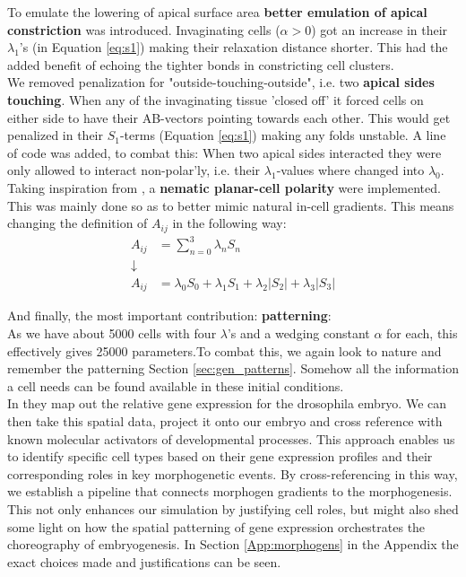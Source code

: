To emulate the lowering of apical surface area \textbf{better emulation of apical constriction} was introduced. Invaginating cells ($\alpha > 0$) got an increase in their $\lambda_1$'s (in Equation \ref{eq:s1}) making their relaxation distance shorter. This had the added benefit of echoing the tighter bonds in constricting cell clusters.\\

We removed penalization for "outside-touching-outside", i.e. two \textbf{apical sides touching}. When any of the invaginating tissue 'closed off' it forced cells on either side to have their AB-vectors pointing towards each other. This would get penalized in their $S_1$-terms (Equation \ref{eq:s1}) making any folds unstable. A line of code was added, to combat this: When two apical sides interacted they were only allowed to interact non-polar'ly, i.e. their $\lambda_1$-values where changed into $\lambda_0$.\\


Taking inspiration from , a \textbf{nematic planar-cell polarity} were implemented. This was mainly done so as to better mimic natural in-cell gradients. This means changing the definition of $A_{ij}$ in the following way:
\begin{align*}
    A_{ij}&=\sum_{n=0}^{3}\lambda_n  S_n\\ \downarrow \\A_{ij}&=\lambda_0S_0+\lambda_1S_1+\lambda_2|S_2|+\lambda_3|S_3|
\end{align*}


And finally, the most important contribution: \textbf{patterning}:\\
As we have about 5000 cells with four $\lambda$'s and a wedging constant $\alpha$ for each, this effectively gives 25000 parameters.To combat this, we again look to nature and remember the patterning Section \ref{sec:gen_patterns}. Somehow all the information a cell needs can be found available in these initial conditions.\\


In  they map out the relative gene expression for the drosophila embryo. We can then take this spatial data, project it onto our embryo and cross reference with known molecular activators of developmental processes.  This approach enables us to identify specific cell types based on their gene expression profiles and their corresponding roles in key morphogenetic events. By cross-referencing in this way, we establish a pipeline that connects morphogen gradients to the morphogenesis. This not only enhances our simulation by justifying cell roles, but might also shed some light on how the spatial patterning of gene expression orchestrates the choreography of embryogenesis. In Section \ref{App:morphogens} in the Appendix the exact choices made and justifications can be seen.\\

